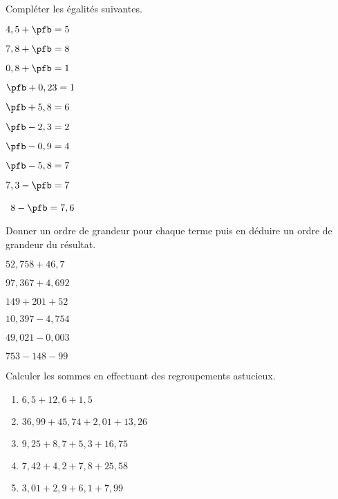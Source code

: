 \begin{colonne*exercice}


\begin{exercice}
   Compléter les égalités suivantes.
   \begin{colenumerate}{2}
      \item $4,5+\pfb =5$
      \item $7,8+\pfb=8$
      \item $0,8+\pfb=1$
      \item $\pfb+0,23=1$
      \item $\pfb+5,8=6$
      \item $\pfb-2,3 =2$
      \item $\pfb-0,9 =4$
      \item $\pfb-5,8 =7$
      \item $7,3-\pfb =7$
      \item \, $8-\pfb =7,6$
   \end{colenumerate}
\end{exercice}

\begin{exercice}
   Donner un ordre de grandeur pour chaque terme puis en déduire un ordre de grandeur du résultat.
   \begin{colenumerate}{2}
      \item $52,758+46,7$
      \item $97,367+4,692$
      \item $149+201+52$
      \item $10,397-4,754$
      \item $49,021-0,003$
      \item $753-148-99$
   \end{colenumerate}
\end{exercice}

\begin{exercice}
   Calculer les sommes en effectuant des regroupements astucieux.
   \begin{enumerate}
      \item $6,5+12,6+1,5$
      \item $36,99+45,74+2,01+13,26$
      \item $9,25+8,7+5,3+16,75$
      \item $7,42+4,2+7,8+25,58$
      \item $3,01+2,9+6,1+7,99$
   \end{enumerate}
\end{exercice}


\end{colonne*exercice}
